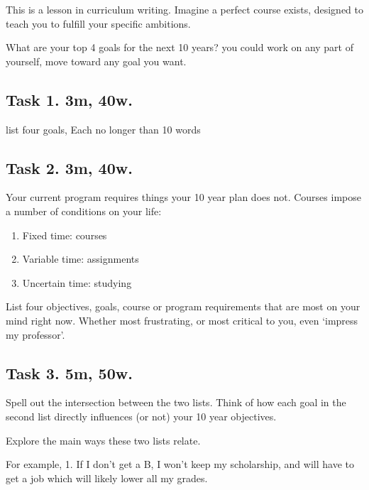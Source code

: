 \documentclass[
]{book}
\providecommand{\tightlist}{%
  \setlength{\itemsep}{0pt}\setlength{\parskip}{0pt}}
\begin{document}
This is a lesson in curriculum writing.
Imagine a perfect course exists,
designed to teach you
to fulfill your specific ambitions.

What are your top 4 goals for
the next 10 years?
you could work on any part of yourself,
move toward any goal you want.

\hypertarget{task-1.-3m-40w.}{%
\subsection{\texorpdfstring{\textbf{Task 1. 3m, 40w.}}{Task 1. 3m, 40w.}}\label{task-1.-3m-40w.}}

list four goals,
Each no longer than 10 words

\hypertarget{task-2.-3m-40w.}{%
\subsection{\texorpdfstring{\textbf{Task 2. 3m, 40w.}}{Task 2. 3m, 40w.}}\label{task-2.-3m-40w.}}

Your current program requires things your 10 year plan does not.
Courses impose a number of
conditions on your life:

\begin{enumerate}
\def\labelenumi{\arabic{enumi}.}
\tightlist
\item
  Fixed time: courses
\item
  Variable time: assignments
\item
  Uncertain time: studying
\end{enumerate}

List four objectives, goals, course or program requirements that are
most on your mind right now.
Whether most frustrating, or most critical
to you, even `impress my professor'.

\hypertarget{task-3.-5m-50w.}{%
\subsection{\texorpdfstring{\textbf{Task 3. 5m, 50w.}}{Task 3. 5m, 50w.}}\label{task-3.-5m-50w.}}

Spell out the intersection between the two lists.
Think of how each goal in the second list
directly influences (or not) your 10 year
objectives.

Explore the main ways these two lists relate.

For example,
1. If I don't get a B, I won't keep my scholarship, and will have to
get a job which will likely lower all my grades.
\end{document}
